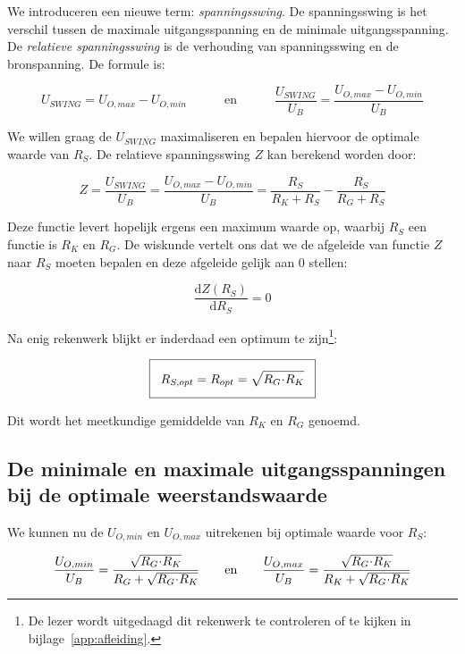 \documentclass[12pt,a4paper,final,twoside,fleqn]{article}
\newcommand{\ropt}{R_{opt}}
\let\oldcdot\cdot
\renewcommand{\cdot}{\kern-.10em\oldcdot\kern-.10em}
\begin{document}
We introduceren een nieuwe term: \textsl{spanningsswing}. De spanningsswing is
het verschil tussen de maximale uitgangsspanning en de minimale uitgangsspanning.
De \textsl{relatieve spanningsswing} is de verhouding van spanningsswing en de
bronspanning. De formule is:

\begin{equation}
U_{SWING} = U_{O,max} - U_{O,min}\quad\qquad\text{en}\quad\qquad\dfrac{U_{SWING}}{U_B}=\dfrac{U_{O,max} - U_{O,min}}{U_B}
\end{equation}

We willen graag de $U_{SWING}$ maximaliseren en bepalen hiervoor de optimale waarde van $R_S$. De relatieve spanningsswing $Z$ kan berekend worden door:

\begin{equation}
Z = \dfrac{U_{SWING}}{U_B}=\dfrac{U_{O,max} - U_{O,min}}{U_B} = \dfrac{R_S}{R_K+R_S}-\dfrac{R_S}{R_G+R_S}
\end{equation}

Deze functie levert hopelijk ergens een maximum waarde op, waarbij $R_S$ een
functie is $R_K$ en $R_G$. De wiskunde vertelt ons dat we de afgeleide van
functie $Z$ naar $R_S$ moeten bepalen en deze afgeleide gelijk aan $0$ stellen:

\begin{equation}
\dfrac{\text{d} Z(R_S)}{\text{d} R_S} = 0
\end{equation}

Na enig rekenwerk  blijkt er inderdaad een optimum te zijn\footnote{De lezer wordt
uitgedaagd dit rekenwerk te controleren of te kijken in bijlage~\ref{app:afleiding}.}:

\begin{equation}
\setlength\fboxsep{2ex}
\boxed{R_{S,opt} = \ropt = \sqrt{R_G\cdot R_K}}
\end{equation}

Dit wordt het meetkundige gemiddelde van $R_K$ en $R_G$ genoemd.

\subsection{De minimale en maximale uitgangsspanningen bij de optimale weerstandswaarde}

 We kunnen
nu de $U_{O,min}$ en $U_{O,max}$ uitrekenen bij optimale waarde voor $R_S$:

\begin{equation}
\dfrac{U_{O,min}}{U_B} = \dfrac{\sqrt{R_G\cdot R_K}}{R_G + \sqrt{R_G\cdot R_K}}
\qquad\text{en}\qquad
\dfrac{U_{O,max}}{U_B} = \dfrac{\sqrt{R_G\cdot R_K}}{R_K + \sqrt{R_G\cdot R_K}}
\end{equation}
\end{document}
